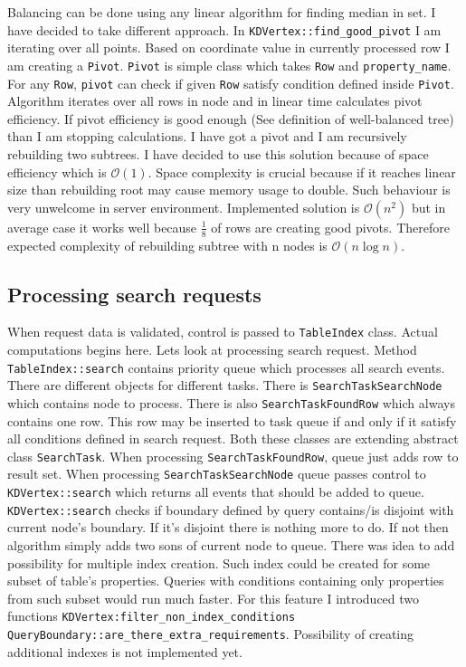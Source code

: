 \documentclass[10pt,a4paper]{article}
\newcommand{\Oh}{\mathcal{O}}
\begin{document}
Balancing can be done using any linear algorithm for finding median in set. I have decided to take different approach. In \verb|KDVertex::find_good_pivot| I am iterating over all points. Based on coordinate value in currently processed row I am creating a \verb|Pivot|. \verb|Pivot| is simple class which takes \verb|Row| and \verb|property_name|. For any \verb|Row|, \verb|pivot| can check if given \verb|Row| satisfy condition defined inside \verb|Pivot|. Algorithm iterates over all rows in node and in linear time calculates pivot efficiency. If pivot efficiency is good enough (See definition of well-balanced tree) than I am stopping calculations. I have got a pivot and I am recursively rebuilding two subtrees. I have decided to use this solution because of space efficiency which is $\Oh(1)$. Space complexity is crucial because if it reaches linear size than rebuilding root may cause memory usage to double. Such behaviour is very unwelcome in server environment. Implemented solution is $\Oh(n^2)$ but in average case it works well because $\frac{1}{8}$ of rows are creating good pivots. Therefore expected complexity of rebuilding subtree with n nodes is $\Oh(n \log n)$. 

\subsection{Processing search requests}

When request data is validated, control is passed to \verb|TableIndex| class. Actual computations begins here. Lets look at processing search request. Method \verb|TableIndex::search| contains priority queue which processes all search events. There are different objects for different tasks. There is \verb|SearchTaskSearchNode| which contains node to process. There is also \verb|SearchTaskFoundRow| which always contains one row. This row may be inserted to task queue if and only if it satisfy all conditions defined in search request. Both these classes are extending abstract class \verb|SearchTask|. When processing \verb|SearchTaskFoundRow|, queue just adds row to result set. When processing \verb|SearchTaskSearchNode| queue passes control to \verb|KDVertex::search| which returns all events that should be added to queue. \verb|KDVertex::search| checks if boundary defined by query contains/is disjoint with current node's boundary. If it's disjoint there is nothing more to do. If not then algorithm simply adds two sons of current node to queue. There was idea to add possibility for multiple index creation. Such index could be created for some subset of table's properties. Queries with conditions containing only properties from such subset would run much faster. For this feature I introduced two functions \verb|KDVertex:filter_non_index_conditions| \verb|QueryBoundary::are_there_extra_requirements|. Possibility of creating additional indexes is not implemented yet.  
\end{document}
